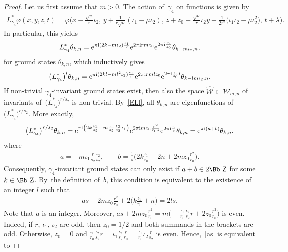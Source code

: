 \documentclass[10pt,a4paper]{amsart}
\newcommand\ZZ{{\mbox{\Bb Z}}}
\newcommand\cW{{\mathcal W}}
\newcommand\ph{\varphi}
\numberwithin{equation}{section}
\begin{document}
\begin{proof}
Let us first assume that $m>0$.
The action of~$\gamma_4$ on functions is given by
\begin{gather*}
L^*_{\gamma_4} \ph(x,y,z,t)=
\ph\bigg(x\!-\! \frac{\sqrt\nu}r\iota_2,\,y\!+\!\frac1{r\sqrt\nu}(\iota_1-\mu\iota_2),\,z\!+\!z_0- \frac{\sqrt\nu}r\iota_2y\!-\!\frac1{2r^2}\big(\iota_1\iota_2\!-\!\mu\iota_2^2\big),\,t\!+\!\lambda\bigg).
\end{gather*}
In particular, this yields
\begin{gather*}
L_{\gamma_4}^*\theta_{k,n}={\rm e}^{\pi {\rm i}(2k-m\iota_2)\frac{\iota_1}{r}}{\rm e}^{2\pi {\rm i} r m z_0}{\rm e}^{2\pi {\rm i} \frac{n}{s_0}} \theta_{k-m\iota_2,n},
\end{gather*}
for ground states $\theta_{k,n}$, which inductively gives
\begin{gather}\label{ELl}
\big(L_{\gamma_4}^*\big)^{l}\theta_{k,n}={\rm e}^{\pi {\rm i}(2kl-ml^2\iota_2)\frac{\iota_1}{r}}{\rm e}^{2\pi {\rm i} rml z_0}{\rm e}^{2\pi {\rm i} \frac{n}{s_0}l} \theta_{k-lm\iota_2,n}.
\end{gather}
If non-trivial $\gamma_4$-invariant ground states exist, then also the space $\hat\cW\subset {\mathcal W}_{m,n}$ of invariants of~$\big(L_{\gamma_4}^*\big)^{r/s_2}$ is non-trivial. By~\eqref{ELl}, all $\theta_{k,n}$ are eigenfunctions of~$\big(L_{\gamma_4}^*\big)^{r/s_2}$. More exactly,
\begin{gather*}
\big(L_{\gamma_4}^*\big)^{r/s_2}\theta_{k,n}={\rm e}^{\pi {\rm i}\left(2k\frac {\iota_1}{s_2}-m\frac r{s_2}\frac{\iota_2}{s_2}\iota_1\right)}{\rm e}^{2\pi {\rm i} mz_0\frac{r^2}{r_0s}}{\rm e}^{2\pi {\rm i} \frac{n}s} \theta_{k,n}={\rm e}^{\pi {\rm i}(a+b)} \theta_{k,n},
\end{gather*}
where
\begin{gather*}
a= -m \iota_1 \frac r{s_2} \frac{\iota_2}{s_2},\qquad
b= \frac1s \bigg(2k \frac{\iota_1}{r_0} +2n+2mz_0\frac{r^2}{r_0}\bigg).
\end{gather*}
Consequently, $\gamma_4$-invariant ground states can only exist if $a+b\in 2\ZZ$ for some $k\in\ZZ$. By~the definition of~$b$, this condition is equivalent to the existence of an integer $l$ such that
\begin{gather}\label{as}
 as +2mz_0\frac{r^2}{r_0}+2\bigg(k\frac {\iota_1}{r_0} +n\bigg)=2ls.
\end{gather}
Note that $a$ is an integer. Moreover, $as+2mz_0\frac{r^2}{r_0}=m\big({-}\frac{\iota_1}{r_0} \frac{\iota_2}{s_2} r+2z_0\frac{r^2}{r_0}\big)$ is even. Indeed, if $r$, $\iota_1$, $\iota_2$ are odd, then $z_0=1/2$ and both summands in the brackets are odd. Otherwise, $z_0=0$ and $\frac{\iota_1}{r_0} \frac{\iota_2}{s_2} r ={\iota_1} \frac{\iota_2}{s_2} \frac r{r_0}=\frac{\iota_1}{r_0} \iota_2 \frac r{s_2}$ is even. Hence,~\eqref{as} is equivalent to

\end{proof}
\end{document}

